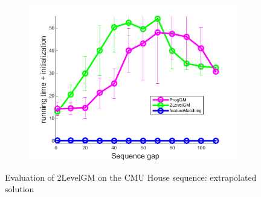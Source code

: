 \begin{figure}[h]
\begin{subfigure}[b]{0.32\textwidth}
			\includegraphics[scale=0.25]{"chapter3/fig/HouseSeq2/anchor_descr/using_cpd_afftrafo/solution/performance/time_summary"}
		\end{subfigure} 	
	\caption[Evaluation of 2LevelGM on the CMU House sequence]{Evaluation of 2LevelGM on the CMU House sequence: extrapolated solution} \label{fig:House_sol}
\end{figure}

